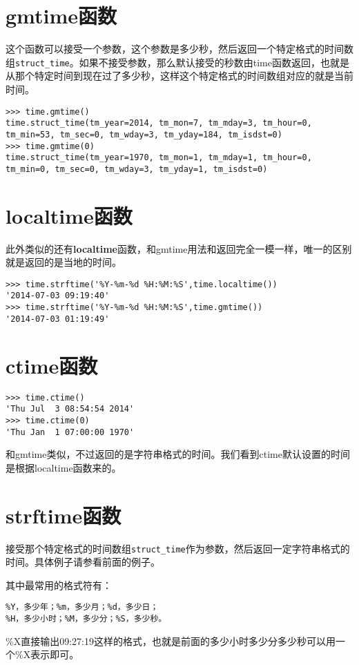 \documentclass[12pt,oneside]{book}
\begin{document}
\begin{common-format}
\section{gmtime函数}
这个函数可以接受一个参数，这个参数是多少秒，然后返回一个特定格式的时间数组\verb+struct_time+。如果不接受参数，那么默认接受的秒数由time函数返回，也就是从那个特定时间到现在过了多少秒，这样这个特定格式的时间数组对应的就是当前时间。

\begin{Verbatim}
>>> time.gmtime()
time.struct_time(tm_year=2014, tm_mon=7, tm_mday=3, tm_hour=0, 
tm_min=53, tm_sec=0, tm_wday=3, tm_yday=184, tm_isdst=0)
>>> time.gmtime(0)
time.struct_time(tm_year=1970, tm_mon=1, tm_mday=1, tm_hour=0, 
tm_min=0, tm_sec=0, tm_wday=3, tm_yday=1, tm_isdst=0)
\end{Verbatim}

\section{localtime函数}
此外类似的还有\textbf{localtime}函数，和gmtime用法和返回完全一模一样，唯一的区别就是返回的是当地的时间。
\begin{Verbatim}
>>> time.strftime('%Y-%m-%d %H:%M:%S',time.localtime())
'2014-07-03 09:19:40'
>>> time.strftime('%Y-%m-%d %H:%M:%S',time.gmtime())
'2014-07-03 01:19:49'
\end{Verbatim}


\section{ctime函数}
\begin{Verbatim}
>>> time.ctime()
'Thu Jul  3 08:54:54 2014'
>>> time.ctime(0)
'Thu Jan  1 07:00:00 1970'
\end{Verbatim}
和gmtime类似，不过返回的是字符串格式的时间。我们看到ctime默认设置的时间是根据localtime函数来的。


\section{strftime函数}
接受那个特定格式的时间数组\verb+struct_time+作为参数，然后返回一定字符串格式的时间。具体例子请参看前面的例子。

其中最常用的格式符有：
\begin{Verbatim}
%Y，多少年；%m，多少月；%d，多少日；
%H，多少小时；%M，多少分；%S，多少秒。
\end{Verbatim}

\%{}X直接输出09:27:19这样的格式，也就是前面的多少小时多少分多少秒可以用一个\%{}X表示即可。


\end{common-format}
\end{document}
